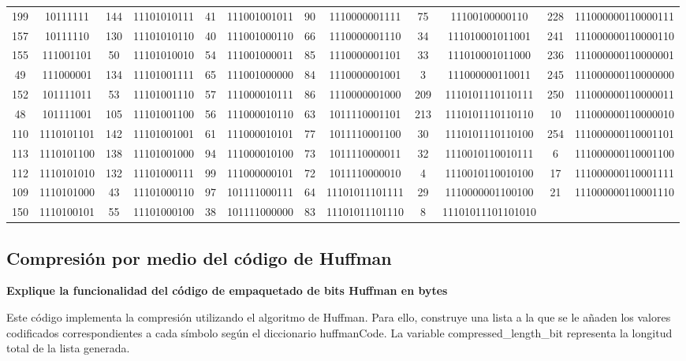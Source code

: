\documentclass[conference,onecolumn,12pt]{IEEEtran}
\numberwithin{equation}{subsection}
\begin{document}
\begin{itemize}
\begin{table}[H]
\begin{tabular}{cccccccccccc}
199 & 10111111 & 144 & 11101010111 & 41 & 111001001011 & 90 & 1110000001111 & 75 & 11100100000110 & 228 & 111000000110000111 \\
157 & 10111110 & 130 & 11101010110 & 40 & 111001000110 & 66 & 1110000001110 & 34 & 111010001011001 & 241 & 111000000110000110 \\
155 & 111001101 & 50 & 11101010010 & 54 & 111001000011 & 85 & 1110000001101 & 33 & 111010001011000 & 236 & 111000000110000001 \\
49 & 111000001 & 134 & 11101001111 & 65 & 111001000000 & 84 & 1110000001001 & 3 & 111000000110011 & 245 & 111000000110000000 \\
152 & 101111011 & 53 & 11101001110 & 57 & 111000010111 & 86 & 1110000001000 & 209 & 1110101110110111 & 250 & 111000000110000011 \\
48 & 101111001 & 105 & 11101001100 & 56 & 111000010110 & 63 & 1011110001101 & 213 & 1110101110110110 & 10 & 111000000110000010 \\
110 & 1110101101 & 142 & 11101001001 & 61 & 111000010101 & 77 & 1011110001100 & 30 & 1110101110110100 & 254 & 111000000110001101 \\
113 & 1110101100 & 138 & 11101001000 & 94 & 111000010100 & 73 & 1011110000011 & 32 & 1110010110010111 & 6 & 111000000110001100 \\
112 & 1110101010 & 132 & 11101000111 & 99 & 111000000101 & 72 & 1011110000010 & 4 & 1110010110010100 & 17 & 111000000110001111 \\
109 & 1110101000 & 43 & 11101000110 & 97 & 101111000111 & 64 & 11101011101111 & 29 & 1110000001100100 & 21 & 111000000110001110 \\
150 & 1110100101 & 55 & 11101000100 & 38 & 101111000000 & 83 & 11101011101110 & 8 & 11101011101101010 \\
\bottomrule
\end{tabular}
\end{table}
    
\end{itemize}


\subsection{Compresión por medio del código de Huffman}

\textbf{Explique la funcionalidad del código de empaquetado de bits Huffman en bytes}

Este código implementa la compresión utilizando el algoritmo de Huffman. Para ello, construye una lista a la que se le añaden los valores codificados correspondientes a cada símbolo según el diccionario huffmanCode. La variable compressed\_length\_bit representa la longitud total de la lista generada.
\end{document}
